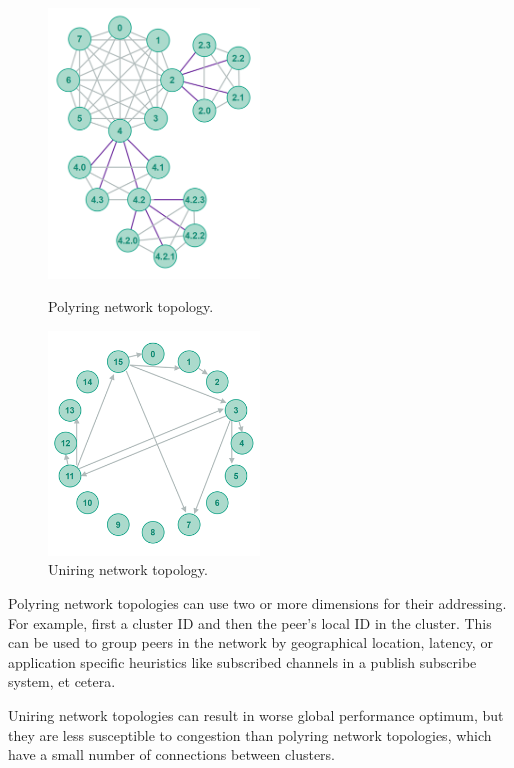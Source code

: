 \begin{figure}
	\centering
	\includegraphics[width=0.5\textwidth]{pictures/polyring.png}
	\caption{Polyring network topology.\cite{Jenkov_undated-kl}}
	\label{Polyring}
	\includegraphics[width=0.5\textwidth]{pictures/uniring.png}
	\caption{Uniring network topology.\cite{Jenkov_undated-kl}}
	\label{Uniring}
\end{figure}

Polyring network topologies can use two or more dimensions for their addressing. For example, first a cluster ID and then the peer's local ID in the cluster. This can be used to group peers in the network by geographical location, latency, or application specific heuristics like subscribed channels in a publish subscribe system, et cetera.

Uniring network topologies can result in worse global performance optimum, but they are less susceptible to congestion than polyring network topologies, which have a small number of connections between clusters.~\cite{Jenkov_undated-kl}

